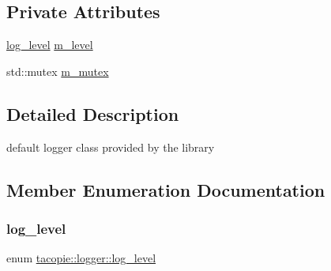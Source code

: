 \subsection*{Private Attributes}
\begin{DoxyCompactItemize}
\item 
\hyperlink{classtacopie_1_1logger_ae7dd235972bbf86a017fc39b3af80efe}{log\+\_\+level} \hyperlink{classtacopie_1_1logger_ae694159c13994aa03bc578feca597c04}{m\+\_\+level}
\item 
std\+::mutex \hyperlink{classtacopie_1_1logger_ab04fda465e61bc7a84aa456bf2e399b0}{m\+\_\+mutex}
\end{DoxyCompactItemize}


\subsection{Detailed Description}
default logger class provided by the library 

\subsection{Member Enumeration Documentation}
\mbox{\label{classtacopie_1_1logger_ae7dd235972bbf86a017fc39b3af80efe}} 
\subsubsection{\texorpdfstring{log\+\_\+level}{log\_level}}
{\footnotesize\ttfamily enum \hyperlink{classtacopie_1_1logger_ae7dd235972bbf86a017fc39b3af80efe}{tacopie\+::logger\+::log\+\_\+level}\hspace{0.3cm}{\ttfamily [strong]}}

